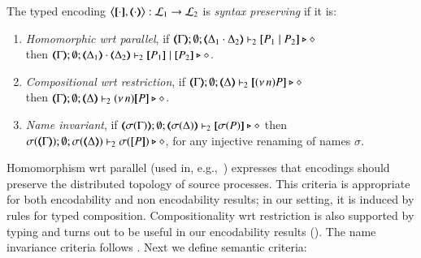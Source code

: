 \begin{definition}\rm
	\label{def:sep}
	The typed encoding 
	$\enco{\map{\cdot}, \mapt{\cdot}}: \tyl{L}_1 \to \tyl{L}_2$ is \emph{syntax preserving}
	if it is:
	
	\begin{enumerate}[1.]
		\item	\emph{Homomorphic wrt parallel},   if 
		$\mapt{\Gamma}; \emptyset; \mapt{\Delta_1 \cat \Delta_2} \proves_2 \map{P_1 \Par P_2} \hastype \Proc$ \\
		then 
		$\mapt{\Gamma}; \emptyset; \mapt{\Delta_1} \cat \mapt{\Delta_2} \proves_2 \map{P_1} \Par \map{P_2} \hastype \Proc$.

		\item	\emph{Compositional wrt restriction},  if 
		$\mapt{\Gamma}; \emptyset; \mapt{\Delta} \proves_2 \map{\news{n}P} \hastype \Proc$ \\
		then 
		$\mapt{\Gamma}; \emptyset; \mapt{\Delta} \proves_2 \news{n}\map{P} \hastype \Proc$.
		
		\item \emph{Name invariant},   if
		$\mapt{\sigma(\Gamma)}; \emptyset; \mapt{\sigma(\Delta)} \proves_2 \map{\sigma(P)} \hastype \Proc$
		then \\
		$\sigma(\mapt{\Gamma}); \emptyset; \sigma(\mapt{\Delta}) \proves_2 \sigma(\map{P}) \hastype \Proc$, 
		for any injective renaming  of names $\sigma$.
	\end{enumerate}
\end{definition}

\smallskip 

\noi Homomorphism wrt parallel (used in, e.g.,~\cite{Palamidessi03,DBLP:conf/lics/PalamidessiSVV06})
expresses that encodings should preserve the distributed topology of source processes. This criteria 
 is appropriate for both encodability and non encodability results; in our setting, it is
induced by rules for typed composition.
Compositionality wrt restriction 
is also supported by typing and turns out to be 
useful in our encodability results ().
The name invariance criteria follows \cite{DBLP:journals/iandc/Gorla10,DBLP:conf/icalp/LanesePSS10}. 
Next we define semantic criteria: %

\smallskip 

